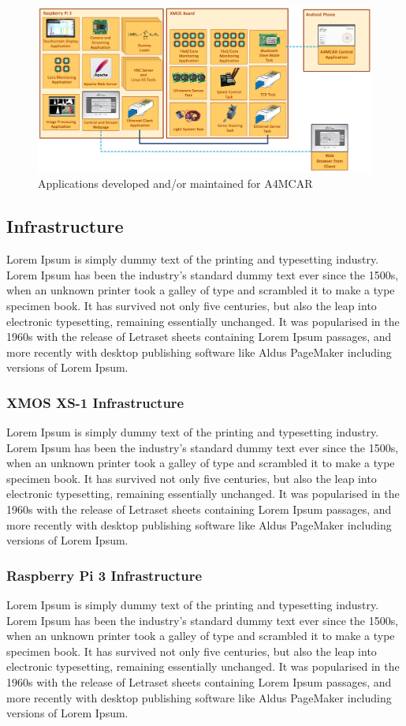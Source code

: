 \begin{figure}[htb]
	\includegraphics[scale=0.3]{content/images/tasksoverall.png}
	\caption{Applications developed and/or maintained for A4MCAR}
	\label{fig:tasksoverall}
\end{figure}

\subsection{Infrastructure}
Lorem Ipsum is simply dummy text of the printing and typesetting industry. Lorem Ipsum has been the industry's standard dummy text ever since the 1500s, when an unknown printer took a galley of type and scrambled it to make a type specimen book. It has survived not only five centuries, but also the leap into electronic typesetting, remaining essentially unchanged. It was popularised in the 1960s with the release of Letraset sheets containing Lorem Ipsum passages, and more recently with desktop publishing software like Aldus PageMaker including versions of Lorem Ipsum.

\subsubsection{XMOS XS-1 Infrastructure}
Lorem Ipsum is simply dummy text of the printing and typesetting industry. Lorem Ipsum has been the industry's standard dummy text ever since the 1500s, when an unknown printer took a galley of type and scrambled it to make a type specimen book. It has survived not only five centuries, but also the leap into electronic typesetting, remaining essentially unchanged. It was popularised in the 1960s with the release of Letraset sheets containing Lorem Ipsum passages, and more recently with desktop publishing software like Aldus PageMaker including versions of Lorem Ipsum.

\subsubsection{Raspberry Pi 3 Infrastructure}
Lorem Ipsum is simply dummy text of the printing and typesetting industry. Lorem Ipsum has been the industry's standard dummy text ever since the 1500s, when an unknown printer took a galley of type and scrambled it to make a type specimen book. It has survived not only five centuries, but also the leap into electronic typesetting, remaining essentially unchanged. It was popularised in the 1960s with the release of Letraset sheets containing Lorem Ipsum passages, and more recently with desktop publishing software like Aldus PageMaker including versions of Lorem Ipsum.

